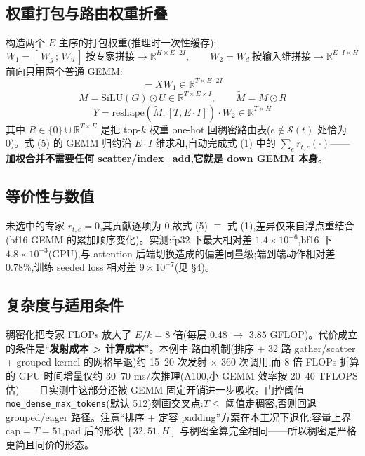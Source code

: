 \documentclass[11pt]{ctexart}
\begin{document}
\subsection{权重打包与路由权重折叠}
构造两个 $E$ 主序的打包权重(推理时一次性缓存):
\begin{equation}
W_1 = [\,W_g \,;\, W_u\,] \ \text{按专家拼接} \to \mathbb{R}^{H \times E\cdot 2I},
\qquad
W_2 = W_d\ \text{按输入维拼接} \to \mathbb{R}^{E\cdot I \times H}
\end{equation}
前向只用两个普通 GEMM:
\begin{equation}
[\,G \,\|\, U\,] = X W_1 \in \mathbb{R}^{T\times E\cdot 2I}
\end{equation}
\begin{equation}
M = \mathrm{SiLU}(G)\odot U \in \mathbb{R}^{T\times E\times I}, \qquad \tilde{M} = M \odot R
\end{equation}
\begin{equation}
Y = \mathrm{reshape}(\tilde{M}, [T, E\cdot I]) \cdot W_2 \in \mathbb{R}^{T\times H}
\end{equation}
其中 $R \in \{0\}\cup\mathbb{R}^{T\times E}$ 是把 top-$k$ 权重 one-hot 回稠密路由表($e\notin\mathcal{S}(t)$ 处恰为 0)。式 (5) 的 GEMM 归约沿 $E\cdot I$ 维求和,自动完成式 (1) 中的 $\sum_e r_{t,e}(\cdot)$——\textbf{加权合并不需要任何 scatter/index\_add,它就是 down GEMM 本身}。

\subsection{等价性与数值}
未选中的专家 $r_{t,e}=0$,其贡献逐项为 0,故式 (5) $\equiv$ 式 (1),差异仅来自浮点重结合(bf16 GEMM 的累加顺序变化)。实测:fp32 下最大相对差 $1.4\times10^{-6}$,bf16 下 $4.8\times10^{-3}$(GPU),与 attention 后端切换造成的偏差同量级;端到端动作相对差 0.78\%,训练 seeded loss 相对差 $9\times10^{-7}$(见 \S 4)。

\subsection{复杂度与适用条件}
稠密化把专家 FLOPs 放大了 $E/k = 8$ 倍(每层 0.48 $\to$ 3.85 GFLOP)。代价成立的条件是``\textbf{发射成本 > 计算成本}''。本例中:路由机制(排序 + 32 路 gather/scatter + grouped kernel 的网格早退)约 15--20 次发射 $\times$ 360 次调用,而 8 倍 FLOPs 折算的 GPU 时间增量仅约 30--70 ms/次推理(A100,小 GEMM 效率按 20--40 TFLOPS 估)——且实测中这部分还被 GEMM 固定开销进一步吸收。门控阈值 \texttt{moe\_dense\_max\_tokens}(默认 512)刻画交叉点:$T \le$ 阈值走稠密,否则回退 grouped/eager 路径。注意``排序 + 定容 padding''方案在本工况下退化:容量上界 $\mathrm{cap} = T = 51$,pad 后的形状 $[32, 51, H]$ 与稠密全算完全相同——所以稠密是严格更简且同价的形态。
\end{document}
